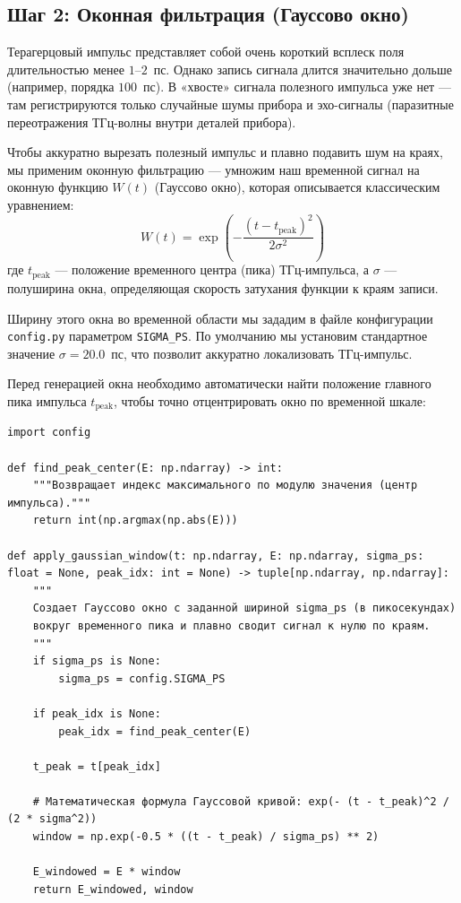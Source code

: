 \subsection{Шаг 2: Оконная фильтрация (Гауссово окно)}

Терагерцовый импульс представляет собой очень короткий всплеск поля длительностью менее $1$--$2$~пс. Однако запись сигнала длится значительно дольше (например, порядка $100$~пс). В «хвосте» сигнала полезного импульса уже нет — там регистрируются только случайные шумы прибора и эхо-сигналы (паразитные переотражения ТГц-волны внутри деталей прибора).

Чтобы аккуратно вырезать полезный импульс и плавно подавить шум на краях, мы применим оконную фильтрацию — умножим наш временной сигнал на оконную функцию $W(t)$ (Гауссово окно), которая описывается классическим уравнением:
\begin{equation}
W(t) = \exp\left( -\frac{(t - t_{\text{peak}})^2}{2\sigma^2} \right)
\end{equation}
где $t_{\text{peak}}$ — положение временного центра (пика) ТГц-импульса, а $\sigma$ — полуширина окна, определяющая скорость затухания функции к краям записи. 

Ширину этого окна во временной области мы зададим в файле конфигурации \texttt{config.py} параметром \texttt{SIGMA\_PS}. По умолчанию мы установим стандартное значение $\sigma = 20.0$~пс, что позволит аккуратно локализовать ТГц-импульс.

Перед генерацией окна необходимо автоматически найти положение главного пика импульса $t_{\text{peak}}$, чтобы точно отцентрировать окно по временной шкале:

\begin{listing}[H]
	\caption{Центрирование и наложение Гауссова окна (spectrum.py)}
	\begin{verbatim}
import config

def find_peak_center(E: np.ndarray) -> int:
    """Возвращает индекс максимального по модулю значения (центр импульса)."""
    return int(np.argmax(np.abs(E)))

def apply_gaussian_window(t: np.ndarray, E: np.ndarray, sigma_ps: float = None, peak_idx: int = None) -> tuple[np.ndarray, np.ndarray]:
    """
    Создает Гауссово окно с заданной шириной sigma_ps (в пикосекундах) 
    вокруг временного пика и плавно сводит сигнал к нулю по краям.
    """
    if sigma_ps is None:
        sigma_ps = config.SIGMA_PS
        
    if peak_idx is None:
        peak_idx = find_peak_center(E)
        
    t_peak = t[peak_idx]
    
    # Математическая формула Гауссовой кривой: exp(- (t - t_peak)^2 / (2 * sigma^2))
    window = np.exp(-0.5 * ((t - t_peak) / sigma_ps) ** 2)
    
    E_windowed = E * window
    return E_windowed, window
	\end{verbatim}
\end{listing}



